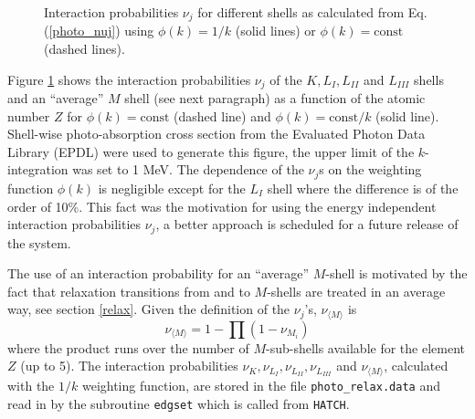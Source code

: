 \begin{enumerate}
\begin{figure}[h]
\caption[Interaction probabilities for different shells]{\label{phot_intp}
Interaction probabilities $\nu_j$ for different shells as
calculated from Eq. (\protect\ref{photo_nuj}) using
$\phi(k)=1/k$ (solid lines) or $\phi(k)=\mbox{const}$ (dashed lines).}
\end{figure}
Figure \ref{phot_intp} shows the interaction probabilities
$\nu_j$ of the $K, L_I, L_{II}$ and  $L_{III}$ shells and an
``average'' $M$ shell (see next paragraph)
as a function of the
atomic number $Z$ for $\phi(k) = \mbox{const}$ (dashed line)
and $\phi(k) = \mbox{const}/k$ (solid line).
Shell-wise photo-absorption cross section from
the Evaluated Photon Data Library (EPDL) \cite{Cu89}
were used to generate this figure, the upper limit of
the $k$-integration was set to 1 MeV. The dependence of
the $\nu_j$s on the weighting function $\phi(k)$ is
negligible except for the $L_I$ shell where the difference
is of the order of 10\%. This fact was the motivation for
using the energy independent interaction probabilities $\nu_j$,
a better approach is scheduled for a future release of the
system.

The use of an interaction probability for an ``average'' $M$-shell
is motivated by the fact that relaxation transitions from and to
$M$-shells are treated in an average way, see section \ref{relax}.
Given the definition of the $\nu_j$'s, $\nu_{\langle M \rangle}$ is
\begin{equation}
\nu_{\langle M \rangle} = 1 - \prod (1 - \nu_{M_i})
\end{equation}
where the product runs over the number of $M$-sub-shells available
for the element $Z$ (up to 5). The interaction probabilities
$\nu_K, \nu_{L_I}, \nu_{L_{II}}, \nu_{L_{III}}$ and $\nu_{\langle M \rangle}$,
calculated with the $1/k$ weighting function, are stored in the
file {\tt photo\_relax.data} and read in by the subroutine
{\tt edgset} which is called from {\tt HATCH}.


\end{enumerate}
